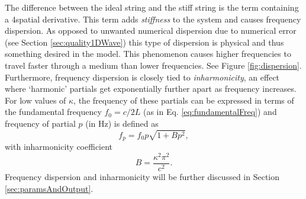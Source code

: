 The difference between the ideal string and the stiff string is the term containing a 4\thOrder spatial derivative. This term adds \textit{stiffness} to the system and causes frequency dispersion. As opposed to unwanted numerical dispersion due to numerical error (see Section \ref{sec:quality1DWave}) this type of dispersion is physical and thus something desired in the model. This phenomenon causes higher frequencies to travel faster through a medium than lower frequencies. See Figure \ref{fig:dispersion}. Furthermore, frequency dispersion is closely tied to \textit{inharmonicity}, an effect where `harmonic' partials get exponentially further apart as frequency increases. For low values of $\kappa$, the frequency of these partials can be expressed in terms of the fundamental frequency $f_0 = c/2L$ (as in Eq. \eqref{eq:fundamentalFreq}) and frequency of partial $p$ (in Hz) is defined as \cite{theBible}
\begin{equation}\label{eq:inharmonicityEquation}
    f_p = f_0 p \sqrt{1 + B p^2},
\end{equation}
with inharmonicity coefficient 
\begin{equation*}
    B = \frac{\kappa^2 \pi^2}{c^2}.
\end{equation*}
Frequency dispersion and inharmonicity will be further discussed in Section \ref{sec:paramsAndOutput}.

